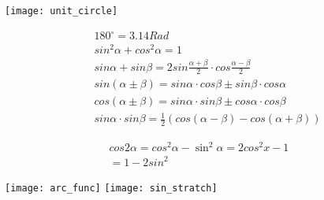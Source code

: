 \documentclass[10pt,a4paper]{scrartcl}
\begin{document}
	\begin{minipage}{0.40\linewidth}
	\texttt{[image: unit\_circle]} \\
	\end{minipage}
	\hfill
	\begin{minipage}{0.6\linewidth}
		\begin{align*}
		& 180^\circ = 3.14 Rad \\
		& sin^2\alpha + cos^2\alpha = 1 \\
		&sin \alpha + sin \beta = 2 sin \frac{\alpha + \beta}{2} \cdot cos \frac{\alpha - \beta}{2}\\
		&sin(\alpha \pm \beta) = sin \alpha \cdot cos \beta \pm sin \beta \cdot cos \alpha \\
		&cos(\alpha \pm \beta) = sin \alpha \cdot sin \beta \pm cos \alpha \cdot cos \beta \\		
		&sin \alpha \cdot sin \beta = \frac{1}{2}(cos(\alpha - \beta) - cos(\alpha + \beta))
		\end{align*}
		\begin{minipage}{1\linewidth}
		\begin{align*}
		cos 2 \alpha = cos^2 \alpha - \sin^2 \alpha = 2cos^2x-1& \\
		=1-2sin^2&
		\end{align*}
		\end{minipage}
	\end{minipage}
	\texttt{[image: arc\_func]}
	\hfill
	\texttt{[image: sin\_stratch]}
\end{document}
